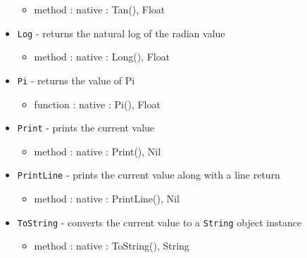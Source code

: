 \documentclass[12pt]{article}
\begin{document}
\begin{itemize}
\begin{itemize}
	\item method : native : Tan(), Float
	\end{itemize}	
    \item \texttt{Log} - returns the natural log of the radian value
    	\begin{itemize}
	\item method : native : Long(), Float
	\end{itemize}
    \item \texttt{Pi} - returns the value of Pi
    	\begin{itemize}
	\item function : native : Pi(), Float
	\end{itemize}
    \item \texttt{Print} - prints the current value
    	\begin{itemize}
	\item method : native : Print(), Nil
	\end{itemize}
    \item \texttt{PrintLine} - prints the current value along with a line return
    	\begin{itemize}
	\item method : native : PrintLine(), Nil
	\end{itemize}
    \item \texttt{ToString} - converts the current value to a \texttt{String} object instance
   	\begin{itemize}
	\item method : native : ToString(), String
	\end{itemize}
\end{itemize}
\end{document}
